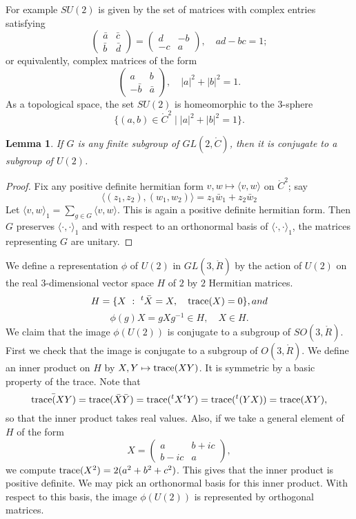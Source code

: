 \documentclass{amsart}
\newtheorem{lemma}[equation]{Lemma}
\def\t#1{\hbox{}^t#1}
\def\CC{\ring{C}}
\def\RR{\ring{R}}
\begin{document}
For example $SU(2)$ is given by the set of matrices with complex entries satisfying
\[
\begin{pmatrix}{\bar a} & {\bar c} \\ \bar b & \bar d\end{pmatrix} = 
\begin{pmatrix}d & - b\\ -c & a \end{pmatrix},\quad ad - bc = 1;
\]
or equivalently, complex matrices of the form
\[
\begin{pmatrix}a & b\\ -\bar b & \bar a\end{pmatrix},\quad |a|^2 + |b|^2 = 1.
\]
As a topological space, the set $SU(2)$ is homeomorphic to
 the $3$-sphere 
$$\{(a,b)\in \CC^2\mid |a|^2 + |b|^2 = 1\}.$$


\begin{lemma} If $G$ is any finite subgroup of $GL(2,\CC)$, then it is
conjugate to a subgroup of $U(2)$.
\end{lemma}

\begin{proof} Fix any positive definite hermitian form $v,w\mapsto \langle v,w\rangle $ on $\CC^2$;
say 
\[\langle (z_1,z_2),(w_1,w_2)\rangle  = z_1 \bar w_1 + z_2 \bar w_2\]
Let $\langle v,w\rangle_1 = \sum_{g\in G} \langle v,w\rangle$.  This is again a positive definite
hermitian form.    Then $G$ preserves $\langle\cdot,\cdot\rangle_1$ and with respect 
to an orthonormal basis  of $\langle\cdot,\cdot\rangle_1$, the matrices representing $G$ are unitary.
\end{proof}

We define a representation $\phi$ of $U(2)$ in $GL(3,\RR)$ by the action of $U(2)$ on the real $3$-dimensional
 vector space $H$
of $2$ by $2$ Hermitian matrices.
\[
H = \{ X \mid \t{\bar X} = X,\quad \op{trace}(X)=0\}, and 
\]
  \[
   \phi(g) X = {g} X g^{-1} \in H, \quad X\in H.
  \]
We claim that the image $\phi(U(2))$ is conjugate to a subgroup of  $SO(3,\RR)$.
First we check that the image is conjugate to a subgroup of $O(3,\RR)$.  We define an inner product
on $H$ by  $X,Y\mapsto {\operatorname{trace}}(XY)$.  It is symmetric by a basic property of the trace.  Note that 
\[
\bar {\op{trace}(XY)} = \op{trace}(\bar X \bar Y) = \op{trace}(\t{X}\t{Y}) = \op{trace}(\t{(YX)}) = \op{trace}(XY),
\]
so that the inner product takes real values.
Also, if we take a general element of $H$ of the form
\[
X = \begin{pmatrix} a & b + i c \\ b - i c & a\end{pmatrix},
\]
we compute ${\operatorname{trace}}(X^2) = 2 (a^2 + b^2 + c^2)$.  This gives that the inner product is positive definite.  We may
pick an orthonormal basis for this inner product.  With respect to this basis, the image $\phi(U(2))$
is represented by orthogonal matrices.
\end{document}
